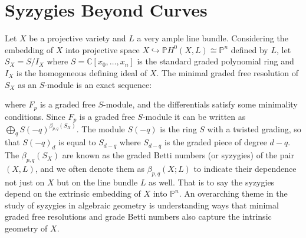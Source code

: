 \documentclass[11pt,reqno]{amsart}
\theoremstyle{remark}
\newcommand{\C}{\mathbb{C}}
\renewcommand{\P}{\mathbb{P}}
\begin{document}
\section{Syzygies Beyond Curves}\label{sec:syzygies-beyond}


Let $X$ be a projective variety and $L$ a very ample line bundle. Considering the embedding of $X$ into projective space $X \hookrightarrow \P H^{0}(X,L)\cong \P^{n}$ defined by $L$, let $S_{X}=S/I_{X}$ where $S=\C[x_{0},\ldots,x_{n}]$ is the standard graded polynomial ring and $I_{X}$ is the homogeneous defining ideal of $X$. The minimal graded free resolution of $S_{X}$ as an $S$-module is an exact sequence:
\begin{center}
\end{center}
where $F_{p}$ is a graded free $S$-module, and the differentials satisfy some minimality conditions. Since $F_{p}$ is a graded free $S$-module it can be written as $\bigoplus_{q}S(-q)^{\beta_{p,q}(S_{X})}$. The module $S(-q)$ is the ring $S$ with a twisted grading, so that $S(-q)_{d}$ is equal to $S_{d-q}$ where $S_{d-q}$ is the graded piece of degree $d-q$. The $\beta_{p,q}(S_{X})$ are known as the graded Betti numbers (or syzygies) of the pair $(X,L)$, and we often denote them as $\beta_{p,q}(X;L)$ to indicate their dependence not just on $X$ but on the line bundle $L$ as well. That is to say the syzygies depend on the extrinsic embedding of $X$ into $\P^{n}$. An overarching theme in the study of syzygies in algebraic geometry is understanding ways that minimal graded free resolutions and grade Betti numbers also capture the intrinsic geometry of $X$.   
\end{document}
